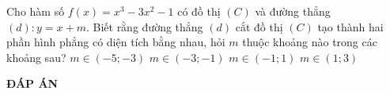 \begin{ex}%
	Cho hàm số $f(x)=x^3-3x^2-1$ có đồ thị $(C)$ và đường thẳng $(d): y=x+m$. Biết rằng đường thẳng $(d)$ cắt đồ thị $(C)$ tạo thành hai phần hình phẳng có diện tích bằng nhau, hỏi $m$ thuộc khoảng nào trong các khoảng sau?
	\choice
	{\True $m\in (-5; -3)$}
	{$m\in (-3; -1)$}
	{$m\in (-1; 1)$}
	{$m\in (1; 3)$}
\end{ex}

\newpage
\begin{center}
	\textbf{ĐÁP ÁN}
\end{center}
\begin{multicols}{10}
	 
\end{multicols}
